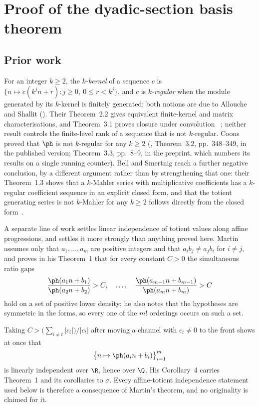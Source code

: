 \section{Proof of the dyadic-section basis theorem}\label{sec:rank}

\subsection{Prior work}

For an integer $k\ge2$, the \emph{$k$-kernel} of a sequence $c$ is
$\{n\mapsto c(k^jn+r):j\ge0,\ 0\le r<k^j\}$, and $c$ is \emph{$k$-regular}
when the module generated by its $k$-kernel is finitely generated; both
notions are due to Allouche and Shallit
(\cite[Defs.~1.1 and 2.1, author-preprint pp.~2--3]{allouche-shallit}).
Their Theorem~2.2 gives equivalent finite-kernel and matrix
characterisations, and Theorem~3.1 proves closure under convolution
~\cite[pp.~3--4 and 10--11]{allouche-shallit}; neither result controls the
finite-level rank of a sequence that is not $k$-regular.  Coons proved that
$\ph$ is not $k$-regular for any $k\ge2$ (\cite{coons}, Theorem~3.2,
pp.~348--349, in the published version; Theorem~3.3, pp.~8--9, in the
preprint, which numbers its results on a single running counter).  Bell and
Smertnig reach a further negative
conclusion, by a different argument rather than by strengthening that one:
their Theorem~1.3 shows that a $k$-Mahler series with multiplicative
coefficients has a $k$-regular coefficient sequence in an explicit closed form,
and that the totient generating series is not $k$-Mahler for any $k\ge2$
follows directly from the closed form~\cite{bell-smertnig}.

A separate line of work settles linear independence of totient values along
affine progressions, and settles it more strongly than anything proved here.
Martin~\cite{martin-phi-inequalities} assumes only that $a_1,\dots,a_m$ are
positive integers and that $a_ib_j\neq a_jb_i$ for $i\neq j$, and proves in his
Theorem~1 that for every constant $C>0$ the simultaneous ratio gaps
\[
 \frac{\ph(a_1n+b_1)}{\ph(a_2n+b_2)}>C,\quad\dots,\quad
 \frac{\ph(a_{m-1}n+b_{m-1})}{\ph(a_mn+b_m)}>C
\]
hold on a set of positive lower density; he also notes that the hypotheses are
symmetric in the forms, so every one of the $m!$ orderings occurs on such a set.

Taking $C>\bigl(\sum_{i\neq t}|c_i|\bigr)/|c_t|$ after moving a channel with
$c_t\neq0$ to the front shows at once that
\[
 \bigl\{n\mapsto\ph(a_in+b_i)\bigr\}_{i=1}^m
\]
is linearly independent over $\R$, hence over $\Q$.  His Corollary~4 carries
Theorem~1 and its corollaries to $\sigma$.  Every affine-totient independence
statement used below is therefore a consequence of Martin's theorem, and no
originality is claimed for it.

